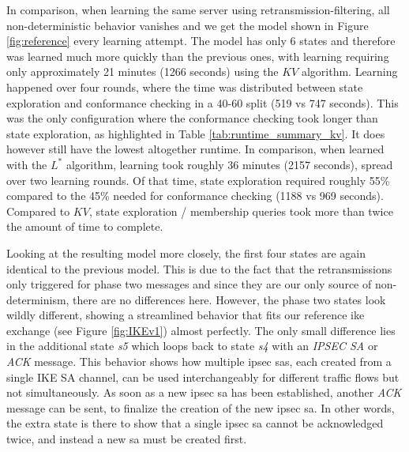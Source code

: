 In comparison, when learning the same server using retransmission-filtering, all non-deterministic behavior vanishes and we get the model shown in Figure \ref{fig:reference} every learning attempt. The model has only 6 states and therefore was learned much more quickly than the previous ones, with learning requiring only approximately 21 minutes (1266 seconds) using the $KV$ algorithm. Learning happened over four rounds, where the time was distributed between state exploration and conformance checking in a 40-60 split (519 vs 747 seconds). This was the only configuration where the conformance checking took longer than state exploration, as highlighted in Table \ref{tab:runtime_summary_kv}. It does however still have the lowest altogether runtime. In comparison, when learned with the $L^*$ algorithm, learning took roughly 36 minutes (2157 seconds), spread over two learning rounds. Of that time, state exploration required roughly 55\% compared to the 45\% needed for conformance checking (1188 vs 969 seconds). Compared to $KV$, state exploration / membership queries took more than twice the amount of time to complete.

Looking at the resulting model more closely, the first four states are again identical to the previous model. This is due to the fact that the retransmissions only triggered for phase two messages and since they are our only source of non-determinism, there are no differences here. However, the phase two states look wildly different, showing a streamlined behavior that fits our reference \ac{ike} exchange (see Figure \ref{fig:IKEv1}) almost perfectly. The only small difference lies in the additional state \emph{s5} which loops back to state \emph{s4} with an \emph{IPSEC SA} or \emph{ACK} message. This behavior shows how multiple \ac{ipsec} \acp{sa}, each created from a single IKE SA channel, can be used interchangeably for different traffic flows but not simultaneously. As soon as a new \ac{ipsec} \ac{sa} has been established, another \emph{ACK} message can be sent, to finalize the creation of the new \ac{ipsec} \ac{sa}. In other words, the extra state is there to show that a single \ac{ipsec} \ac{sa} cannot be acknowledged twice, and instead a new \ac{sa} must be created first.

